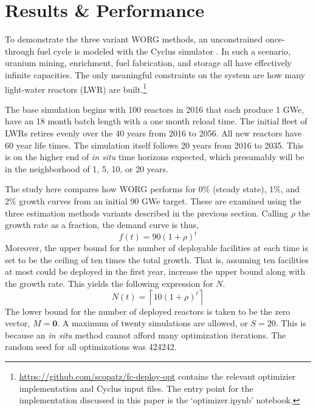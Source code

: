 \section{Results \& Performance}
\label{results}

To demonstrate the three variant WORG methods, an unconstrained
once-through fuel cycle is modeled with the Cyclus simulator
\cite{DBLP:journals/corr/HuffGCFMOSSW15}. In such a scenario, uranium
mining, enrichment, fuel fabrication, and storage all have effectively
infinite capacities. The only meaningful constraints on the system are
how many light-water reactors (LWR) are built.\footnote{
\url{https://github.com/scopatz/fc-deploy-opt} contains the relevant
optimizier implementation and Cyclus input files. The entry point for
the implementation discussed in this paper is the `optimizer.ipynb'
notebook.}

The base simulation begins with 100 reactors in 2016 that each produce
1 GWe, have an 18 month batch length with a one month reload time.
The initial fleet of LWRs retires evenly over the 40 years from 2016 to
2056. All new reactors have 60 year life times.  The simulation itself
follows 20 years from 2016 to 2035. This is on the higher end of
\emph{in situ} time horizons expected, which presumably
will be in the neighborhood of 1, 5, 10, or 20 years.

The study here compares how WORG performs for 0\% (steady state), 1\%,
and 2\% growth curves from an initial 90 GWe target. These are examined
using the three estimation methods variants described in the previous section.
Calling $\rho$ the growth rate as a
fraction, the demand curve is thus,
\begin{equation}
\label{f-rate}
f(t) = 90 (1 + \rho)^t
\end{equation}
Moreover, the upper bound for the number of deployable facilities at
each time is set to be the ceiling of ten times the total growth.
That is, assuming ten facilities at most could be deployed in the first
year, increase the upper bound along with the growth rate.  This yields
the following expression for $N$.
\begin{equation}
\label{n-rate}
N(t) = \left\lceil 10 (1 + \rho)^t\right\rceil
\end{equation}
The lower bound for the number of deployed reactors is taken to be the
zero vector, $M = \mathbf{0}$.  A maximum of twenty simulations are allowed,
or $S = 20$.
This is because an \emph{in situ} method cannot afford many optimization
iterations. The random seed for all optimizations was 424242.

